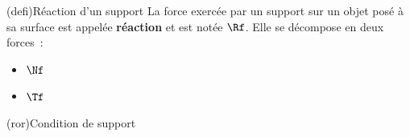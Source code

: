 \documentclass[../../main/main.tex]{subfiles}
\begin{document}
\begin{tcb*}[sidebyside, righthand ratio=.4](defi){Réaction d'un support}
	La force exercée par un support sur un objet posé à sa surface est appelée
	\textbf{réaction} et est notée $\Rf$. Elle se décompose en deux forces~:
	\psw{%
		\[
			\Rf = \Nf + \Tf
			\qou
			\Rf = \Rf_N + \Rf_T
		\]
	}
	\vspace{-15pt}
	\begin{itemize}
		\item $\Nf$ 
		\item $\Tf$ 
	\end{itemize}
	\tcblower
	\begin{center}
		\vspace{-15pt}
	\end{center}
\end{tcb*}
\begin{tcb*}(ror){Condition de support}
\end{tcb*}
\end{document}
